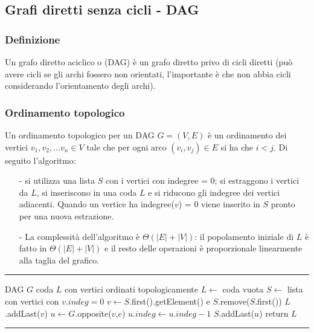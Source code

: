 \documentclass[a4paper]{article}
\makeatletter
\newenvironment{algo}[4]{
	\noindent\rule{\textwidth}{0.4pt}
	\begin{algorithmic}[1]
		\addtocounter{ALG@line}{-1}
		\Procedure{#1}{#2}
		\Require #3
		\Ensure #4
		\Statex }{
		\EndProcedure
	\end{algorithmic}
	\rule{\textwidth}{0.4pt}}
\makeatother
\begin{document}
\newpage

\subsection{Grafi diretti senza cicli - DAG}
\subsubsection*{Definizione}
Un grafo diretto aciclico o (DAG) è un grafo diretto privo di cicli diretti (può avere cicli se gli archi fossero non orientati,
l'importante è che non abbia cicli considerando l'orientamento degli archi).

\subsubsection*{Ordinamento topologico}
Un ordinamento topologico per un DAG \(G = (V,E)\) è un ordinamento dei vertici \(v_1, v_2, \dots v_n \in V\) tale che per ogni
arco \((v_i, v_j) \in E\) si ha che \(i < j\). Di seguito l'algoritmo:

\begin{itemize}[topsep=3pt, itemsep=0pt]
	\item[-] si utilizza una lista \(S\) con i vertici con indegree = 0; si estraggono i vertici da \(L\), si inseriscono in
	una coda \(L\) e si riducono gli indegree dei vertici adiacenti. Quando un vertice ha indegree(\(v\)) = 0 viene inserito
	in \(S\) pronto per una nuova estrazione.
	\item[-] La complessità dell'algoritmo è \(\Theta(|E|+|V|)\): il popolamento iniziale di \(L\) è fatto in \(\Theta(|E|+|V|)\)
	e il resto delle operazioni è proporzionale linearmente alla taglia del grafico.
\end{itemize}
\begin{algo}{TopologicalSort}{$G$}{DAG $G$}{coda \(L\) con vertici ordinati topologicamente}
	\State \(L \gets\) coda vuota
	\State \(S \gets\) lista con vertici con \(v.indeg = 0\)
		\State \(v \gets S\).first().getElement() e \(S\).remove(\(S\).first())
		\State \(L\).addLast(\(v\))
			\State \(u \gets G\).opposite(\(v\),\(e\))
			\State \(u.indeg \gets u.indeg - 1\)
			 \(S\).addLast(\(u\))
			\EndIf
		\EndFor
	\EndWhile
	\State return \(L\)
\end{algo}
\end{document}
